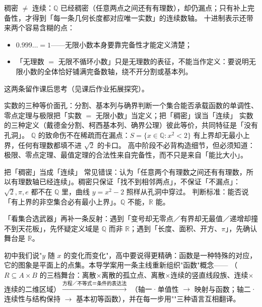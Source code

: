 稠密 $\neq$ 连续：$\mathbb{Q}$ 已经稠密（任意两点之间还有有理数），却仍漏点；只有补上完备性，才得到「每一条几何长度都对应唯一实数」的连续数轴。
十进制表示还带来两个容易含糊的点：
\begin{itemize}
  \item $0.999\dots=1$——无限小数本身要靠完备性才能定义清楚；
  \item 「无理数 $=$ 无限不循环小数」只是无理数的表征，不能当作定义：要说明无限小数的全体恰好铺满完备数轴，绕不开分割或基本列。
\end{itemize}
这两条留作课后思考（见课后作业拓展探究）。

\begin{conccard}[一级]{实数的三种等价面孔：分割、基本列与确界}{判断一个集合能否承载函数的单调性、零点定理与极限}{把「实数 $=$ 无限小数」当定义；把「稠密」误当「连续」}
实数的三种定义（戴德金分割、柯西基本列、确界公理）彼此等价，共同特征是「没有孔洞」。
$\mathbb{Q}$ 的致命伤不在稀疏而在漏点：$S=\{x\in\mathbb{Q}:x^2<2\}$ 有上界却无最小上界，任何有理数都填不进 $\sqrt2$ 的卡口。
高中阶段不必背构造细节，但必须知道：极限、零点定理、最值定理的合法性来自完备性，而不只是来自「能比大小」。
\end{conccard}

\begin{commonerror}{把「稠密」当成「连续」}
常见错误：认为「任意两个有理数之间还有有理数，所以有理数轴已经连续」。稠密只保证「找不到相邻两点」，不保证「不漏点」：$\sqrt2,\pi,e$ 都不在 $\mathbb{Q}$ 里，曲线 $y=x^2-2$ 照样从孔洞中穿过。
判断标准：能否说「有上界的非空集合必有最小上界」。$\mathbb{Q}$ 不能，$\mathbb{R}$ 能。
\end{commonerror}

\begin{method}
「看集合选武器」再补一条反射：遇到「变号却无零点／有界却无最值／递增却撞不到天花板」，先怀疑定义域是 $\mathbb{Q}$ 而非 $\mathbb{R}$；遇到「长度、面积、开方、$\pi$」，先确认舞台是 $\mathbb{R}$。
\end{method}


初中我们说"$y$ 随 $x$ 的变化而变化"，高中要说得更精确：函数是一种特殊的对应，它的图象是平面上的点集。本导学案用一条主线重新组织"函数"概念——
（$R\subseteq A\times B$ 的三档舞台：离散$\times$离散的孤立点、离散$\times$连续的竖直线段族、连续$\times$连续的二维区域）$\xrightarrow{\text{方程／不等式＝条件的表达法}}$ （轴一·单值性 $\to$ 映射与函数；轴二·连续性与结构保持 $\to$ 基本初等函数），并在每一步用""三种语言互相翻译。

